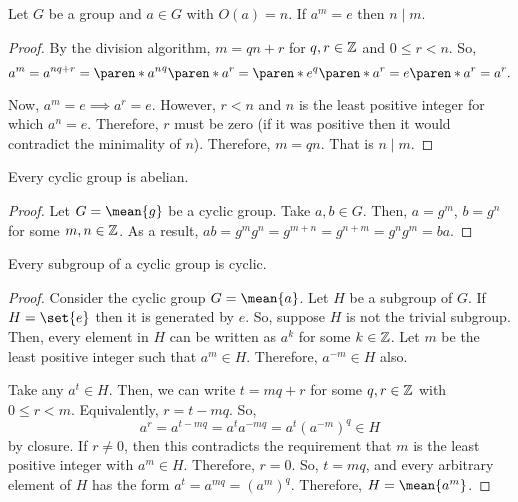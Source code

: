 \documentclass[11pt]{penrose}
\newcommand{\cyclic}[1]{\mean{#1}}
\begin{document}
\begin{nthm}
    Let $G$ be a group and $a \in G$ with $O(a) = n$. If $a^m = e$ then $n \mid m$.
\end{nthm}
\begin{proof}
    By the division algorithm, $m = qn + r$ for $q, r \in \mathbb{Z}$ and $0 \leq r < n$. So,
    \begin{equation*}
        a^m = a^{nq + r} = \paren*{{a^n}^q} \paren*{a^r} = \paren*{e^q} \paren*{a^r} = e \paren*{a^r} = a^r.
    \end{equation*}

    Now, $a^m = e \implies a^r = e$. However, $r < n$ and $n$ is the least positive integer for which $a^n = e$. Therefore, $r$ must be zero (if it was positive then it would contradict the minimality of $n$). Therefore, $m = qn$. That is $n \mid m$.
\end{proof}

\begin{nthm}
    Every cyclic group is abelian.
\end{nthm}
\begin{proof}
    Let $G = \cyclic{g}$ be a cyclic group. Take $a, b \in G$. Then, $a = g^m$, $b = g^n$ for some $m, n \in \mathbb{Z}$. As a result, $ab = g^m g^n = g^{m+n} = g^{n+m} = g^n g^m = ba$.
\end{proof}

\begin{nthm}
    Every subgroup of a cyclic group is cyclic.
\end{nthm}
\begin{proof}
    Consider the cyclic group $G = \cyclic{a}$. Let $H$ be a subgroup of $G$. If $H = \set{e}$ then it is generated by $e$. So, suppose $H$ is not the trivial subgroup. Then, every element in $H$ can be written as $a^k$ for some $k \in \mathbb{Z}$. Let $m$ be the least positive integer such that $a^m \in H$. Therefore, $a^{-m} \in H$ also.

    Take any $a^t \in H$. Then, we can write $t = mq + r$ for some $q, r \in \mathbb{Z}$ with $0 \leq r < m$. Equivalently, $r = t - mq$. So,
    \begin{equation*}
        a^r = a^{t - mq} = a^{t} a^{-mq} = a^{t} (a^{-m})^{q} \in H
    \end{equation*}
    by closure. If $r \neq 0$, then this contradicts the requirement that $m$ is the least positive integer with $a^m \in H$. Therefore, $r = 0$. So, $t = mq$, and every arbitrary element of $H$ has the form $a^t = a^{mq} = (a^{m})^{q}$. Therefore, $H = \cyclic{a^m}$.
\end{proof}
\end{document}
